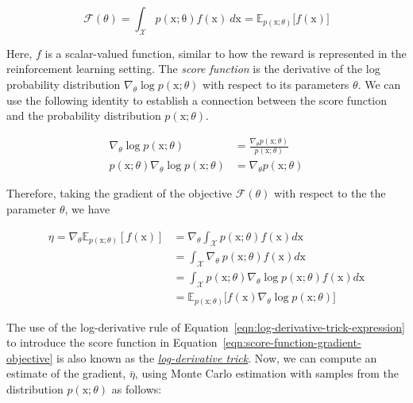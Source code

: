 \begin{equation}\label{eqn:probability-objective}
\mathcal{F}(\theta) = \int_{\mathcal{X}} p(\mathrm{x; \theta})f(\mathrm{x})~d\mathrm{x} = \mathbb{E}_{p(\mathrm{x};\theta)}\big[f(\mathrm{x})\big]
\end{equation}

\noindent Here, $f$ is a scalar-valued function, similar to how the reward is represented in the reinforcement learning setting. The \textit{score function} is the derivative of the log probability distribution $\nabla_{\theta}\log p(\mathrm{x};\theta)$ with respect to its parameters $\theta$. We
can use the following identity to establish a connection between
the score function and the probability distribution $p(\mathrm{x};\theta)$.

\begin{equation}\label{eqn:log-derivative-trick-expression}
    \begin{split}
        \nabla_\theta\log p(\mathrm{x};\theta) &= \frac{\nabla_{\theta}p(\mathrm{x}; \theta)}{p(\mathrm{x};\theta)} \\
        p(\mathrm{x};\theta) \nabla_{\theta}\log p(\mathrm{x};\theta) &= \nabla_{\theta}p(\mathrm{x};\theta)
    \end{split}
\end{equation}

\noindent Therefore, taking the gradient of the objective $\mathcal{F}(\theta)$ with respect to the the parameter $\theta$, we have

\begin{equation}\label{eqn:score-function-gradient-objective}
    \begin{split}
        \eta = \nabla_{\theta} \mathbb{E}_{p(\mathrm{x};\theta)}[f(\mathrm{x})] &= \nabla_{\theta}\int_{\mathcal{X}} p(\mathrm{x};\theta) f(\mathrm{x}) d\mathrm{x} \\
        &= \int_\mathcal{X} \nabla_{\theta}~p(\mathrm{x}; \theta)f(\mathrm{x})d\mathrm{x} \\
        &= \int_{\mathcal{X}}p(\mathrm{x};\theta)\nabla_{\theta}\log p(\mathrm{x}; \theta) f(\mathrm{x})d\mathrm{x} \\
        &=\mathbb{E}_{p(\mathrm{x};\theta)}\big[f(\mathrm{x})\nabla_{\theta}\log p(\mathrm{x};\theta) \big] 
    \end{split}
\end{equation}

\noindent The use of the log-derivative rule of Equation~\ref{eqn:log-derivative-trick-expression} to introduce the score function in Equation~\ref{eqn:score-function-gradient-objective} is also known as the \href{https://blog.shakirm.com/2015/11/machine-learning-trick-of-the-day-5-log-derivative-trick/}{\textit{log-derivative trick}}. Now, we can compute an estimate of the gradient, $\bar{\eta}$, using Monte Carlo estimation with samples from the distribution $p(\mathrm{x};\theta)$ as follows:

